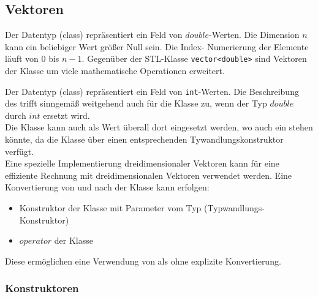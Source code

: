 

\subsection{Vektoren}
\hypertarget{Vector}{}
\hypertarget{IVector}{}

Der Datentyp (class)  repräsentiert ein Feld 
von $double$-Werten. 
Die Dimension $n$ kann ein beliebiger Wert größer Null sein. Die Index-
Numerierung der Elemente läuft von $0$ bis $n-1$. 
Gegenüber der STL-Klasse \verb+vector<double>+ sind Vektoren der Klasse
 um viele mathematische Operationen erweitert.

Der Datentyp (class)  repräsentiert ein Feld von 
\verb+int+-Werten.
Die Beschreibung des  trifft sinngemäß weitgehend auch für die 
Klasse  zu, wenn der Typ $double$ durch $int$ ersetzt wird.\\
Die Klasse  kann auch als Wert überall dort eingesetzt werden, 
wo auch ein  stehen könnte, da die Klasse  über 
einen entsprechenden Tywandlungskonstruktor verfügt.
\\
Eine spezielle Implementierung dreidimensionaler Vektoren  
kann für eine effiziente Rechnung mit dreidimensionalen Vektoren verwendet 
werden. Eine Konvertierung von und nach der Klasse  kann 
erfolgen:
\begin{itemize}
\item Konstruktor der Klasse  mit Parameter vom 
Typ   (Typwandlungs-Konstruktor)
\item $operator$  der Klasse 
\end{itemize}
Diese ermöglichen eine Verwendung von  als 
 ohne explizite Konvertierung.
\\
\subsubsection{Konstruktoren}


